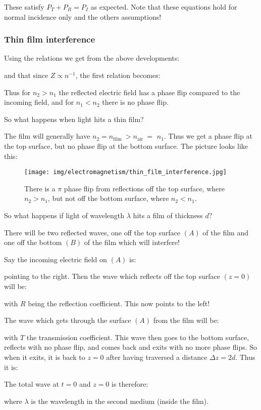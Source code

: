 	These satisfy $P_{T}+P_{R}=P_{I}$ as expected. Note that these equations hold for normal incidence only and the others assumptions!
	
	\subsubsection{Thin film interference}
	Using the relations we get from the above developments:
	
	and that since $Z \propto n^{-1}$, the first relation becomes:
	
	Thus for $n_{2}>n_{1}$ the reflected electric field has a phase flip compared to the incoming field, and for $n_{1}<n_{2}$ there is no phase flip.

	So what happens when light hits a thin film? 
	
	The film will generally have $n_{2}=n_{\text {film }}>n_{\text {air }}=$ $n_{1}$. Thus we get a phase flip at the top surface, but no phase flip at the bottom surface. The picture looks like this:
	\begin{figure}[H]
		\centering
		\texttt{[image: img/electromagnetism/thin\_film\_interference.jpg]}
		\caption[]{There is a $\pi$ phase flip from reflections off the top surface, where $n_{2}>n_{1}$, but not off the bottom surface, where $n_{2}<n_{1}$.}
	\end{figure}
	So what happens if light of wavelength $\lambda$ hits a film of thickness $d ?$ 
	
	There will be two reflected waves, one off the top surface $(A)$ of the film and one off the bottom $(B)$ of the film which will interfere!
	
	Say the incoming electric field on $(A)$ is:
	
	pointing to the right. Then the wave which reflects off the top surface $(z=0)$ will be:
	
	with $R$ being the reflection coefficient. This now points to the left! 
	
	The wave which gets through the surface $(A)$ from the film will be:
	
	with $T$ the transmission coefficient. This wave then goes to the bottom surface, reflects with no phase flip, and comes back and exits with no more phase flips. So when it exits, it is back to $z=0$ after having traversed a distance $\Delta z=2 d$. Thus it is:
	
	The total wave at $t=0$ and $z=0$ is therefore:
	
	where $\lambda$ is the wavelength in the second medium (inside the film).
	
